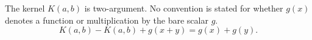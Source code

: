 \documentclass{article}
\begin{document}
The kernel $K(a,b)$ is two-argument.  No convention is stated for whether
$g(x)$ denotes a function or multiplication by the bare scalar $g$.
\begin{equation}
K(a,b)-K(a,b)+g(x+y)=g(x)+g(y).\label{mixed-reading}
\end{equation}
\end{document}
